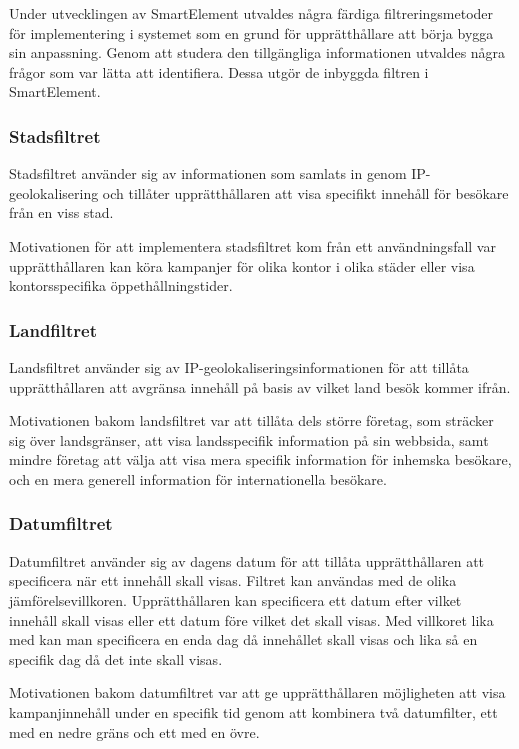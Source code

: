 Under utvecklingen av SmartElement utvaldes några färdiga filtreringsmetoder för implementering i systemet som en grund för upprätthållare att börja bygga sin anpassning. Genom att studera den tillgängliga informationen utvaldes några frågor som var lätta att identifiera. Dessa utgör de inbyggda filtren i SmartElement.

\subsubsection{Stadsfiltret}

Stadsfiltret använder sig av informationen som samlats in genom IP-geolokalisering och tillåter upprätthållaren att visa specifikt innehåll för besökare från en viss stad.

Motivationen för att implementera stadsfiltret kom från ett användningsfall var upprätthållaren kan köra kampanjer för olika kontor i olika städer eller visa kontorsspecifika öppethållningstider.

\subsubsection{Landfiltret}

Landsfiltret använder sig av IP-geolokaliseringsinformationen för att tillåta upprätthållaren att avgränsa innehåll på basis av vilket land besök kommer ifrån.

Motivationen bakom landsfiltret var att tillåta dels större företag, som sträcker sig över landsgränser, att visa landsspecifik information på sin webbsida, samt mindre företag att välja att visa mera specifik information för inhemska besökare, och en mera generell information för internationella besökare.

\subsubsection{Datumfiltret}

Datumfiltret använder sig av dagens datum för att tillåta upprätthållaren att specificera när ett innehåll skall visas. Filtret kan användas med de olika jämförelsevillkoren. Upprätthållaren kan specificera ett datum efter vilket innehåll skall visas eller ett datum före vilket det skall visas. Med villkoret lika med kan man specificera en enda dag då innehållet skall visas och lika så en specifik dag då det inte skall visas.

Motivationen bakom datumfiltret var att ge upprätthållaren möjligheten att visa kampanjinnehåll under en specifik tid genom att kombinera två datumfilter, ett med en nedre gräns och ett med en övre.

